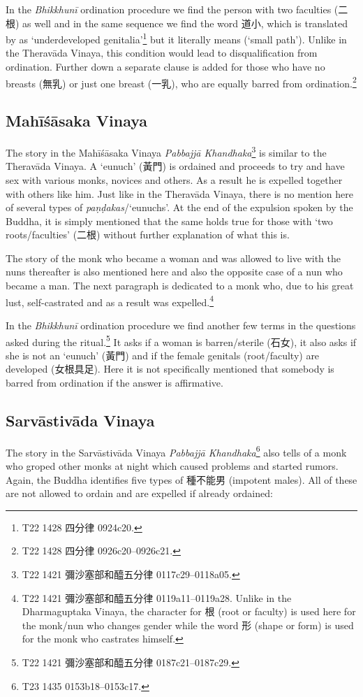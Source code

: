 In the {\em Bhikkhunī} ordination procedure we find the person with two faculties (二根) as well and in the same sequence we find the word 道小, which is translated by \cite{bodhi} as `underdeveloped genitalia'\footnote{T22 1428 四分律 0924c20.} but it literally means (`small path'). Unlike in the Theravāda Vinaya, this condition would lead to disqualification from ordination. Further down a separate clause is added for those who have no breasts (無乳) or just one breast (一乳), who are equally barred from ordination.\footnote{T22 1428 四分律 0926c20–0926c21.}


\subsection{Mahīśāsaka Vinaya}
The story in the Mahīśāsaka Vinaya {\em Pabbajjā Khandhaka}\footnote{T22 1421 彌沙塞部和醯五分律 0117c29–0118a05.} is similar to the Theravāda Vinaya. A `eunuch' (黃門) is ordained and proceeds to try and have sex with various monks, novices and others. As a result he is expelled together with others like him. Just like in the Theravāda Vinaya, there is no mention here of several types of {\em paṇḍakas}/`eunuchs'. At the end of the expulsion spoken by the Buddha, it is simply mentioned that the same holds true for those with `two roots/faculties' (二根) without further explanation of what this is.

The story of the monk who became a woman and was allowed to live with the nuns thereafter is also mentioned here and also the opposite case of a nun who became a man. The next paragraph is dedicated to a monk who, due to his great lust, self-castrated and as a result was expelled.\footnote{T22 1421 彌沙塞部和醯五分律 0119a11–0119a28. Unlike in the Dharmaguptaka Vinaya, the character for 根 (root or faculty) is used here for the monk/nun who changes gender while the word 形 (shape or form) is used for the monk who castrates himself.} 

In the {\em Bhikkhunī} ordination procedure we find another few terms in the questions asked during the ritual.\footnote{T22 1421 彌沙塞部和醯五分律 0187c21–0187c29.} It asks if a woman is barren/sterile (石女), it also asks if she is not an `eunuch' (黃門) and if the female genitals (root/faculty) are developed (女根具足). Here it is not specifically mentioned that somebody is barred from ordination if the answer is affirmative.

\subsection{Sarvāstivāda Vinaya}
The story in the Sarvāstivāda Vinaya {\em Pabbajjā Khandhaka}\footnote{T23 1435 0153b18–0153c17.} also tells of a monk who groped other monks at night which caused problems and started rumors. Again, the Buddha identifies five types of 種不能男 (impotent males). All of these are not allowed to ordain and are expelled if already ordained:

